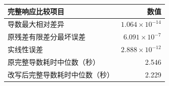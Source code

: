 \begin{tabular}{lr}
\toprule
完整响应比较项目 & 数值 \\
\midrule
导数最大相对差异 & $1.064\times10^{-14}$ \\
原残差有限差分最坏误差 & $6.091\times10^{-7}$ \\
实线性误差 & $2.888\times10^{-12}$ \\
原完整导数耗时中位数（秒） & 2.546 \\
改写后完整导数耗时中位数（秒） & 2.229 \\
\bottomrule
\end{tabular}
